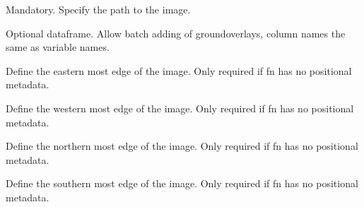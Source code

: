 \documentclass[a4paper]{book}
\begin{document}
\begin{Arguments}
\begin{ldescription}

\item[\code{fn}] Mandatory. Specify the path to the image.
\item[\code{x}] Optional dataframe. Allow batch adding of groundoverlays, column names the same as variable names. 
\item[\code{east}]  Define the eastern most edge of the image. Only required if fn has no positional metadata. 
\item[\code{west}]  Define the western most edge of the image. Only required if fn has no positional metadata. 
\item[\code{north}]  Define the northern most edge of the image. Only required if fn has no positional metadata. 
\item[\code{west}]  Define the southern most edge of the image. Only required if fn has no positional metadata. 



\end{ldescription}
\end{Arguments}
\end{document}
